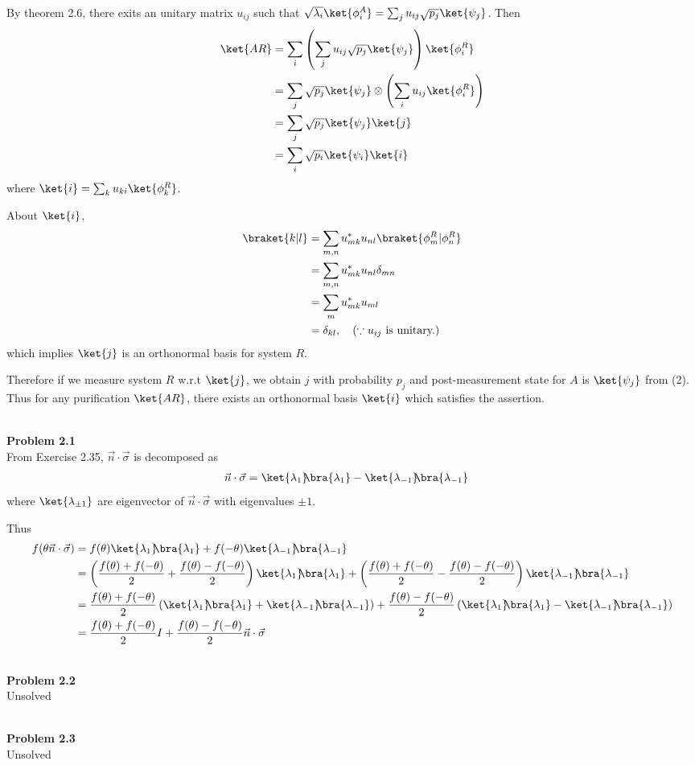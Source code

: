 \documentclass[10pt]{book}
\newcommand{\kb}[1]{\ket{#1}\hspace{-1mm} \bra{#1}} %
\newcommand{\Textbf}[1]{\hspace{3mm}\\ \textbf{#1}\\}
\begin{document}
	By theorem 2.6, there exits an unitary matrix $u_{ij}$ such that $\sqrt{\lambda_i}\ket{\phi_i^A} = \sum_j u_{ij} \sqrt{p_j} \ket{\psi_j}$.
	Then
	\begin{equation}
\begin{aligned}
		\ket{AR} &= \sum_i \left( \sum_j u_{ij} \sqrt{p_j} \ket{\psi_j} \right) \ket{\phi_i^R}\\
		&= \sum_j \sqrt{p_j} \ket{\psi_j} \otimes\left( \sum_i u_{ij} \ket{\phi_i^R} \right)\\
		&= \sum_j \sqrt{p_j} \ket{\psi_j} \ket{j}\\
		&= \sum_i \sqrt{p_i} \ket{\psi_i} \ket{i}
	\end{aligned}
\end{equation}
	where $\ket{i} = \sum_k u_{ki} \ket{\phi_k^R}$.
	
	About $\ket{i}$,
	\begin{equation}
\begin{aligned}
		\braket{k | l} &= \sum_{m,n} u_{mk}^* u_{nl} \braket{\phi_m^R | \phi_n^R }\\
		&= \sum_{m,n} u_{mk}^* u_{nl} \delta_{mn}\\
		&= \sum_m u_{mk}^* u_{ml}\\
		&= \delta_{kl}, ~~~(\because u_{ij} \text{ is unitary.})
	\end{aligned}
\end{equation}
	which implies $\ket{j}$ is an orthonormal basis for system $R$.
	
	Therefore if we measure system $R$ w.r.t $\ket{j}$, we obtain $j$ with probability $p_j$ and post-measurement state for $A$ is $\ket{\psi_j}$ from (2).
	Thus for any purification $\ket{AR}$, there exists an orthonormal basis $\ket{i}$ which satisfies the assertion.
	
	
	\Textbf{Problem 2.1}
	
	From Exercise 2.35, $\vec{n} \cdot \vec{\sigma}$ is decomposed as
	\begin{equation}
\begin{aligned}
		\vec{n} \cdot \vec{\sigma} &= \kb{\lambda_1} - \kb{\lambda_{-1}}
	\end{aligned}
\end{equation}
	where $\ket{\lambda_{\pm 1}}$ are eigenvector of $\vec{n} \cdot \vec{\sigma}$ with eigenvalues $\pm 1$.
	
	Thus
	\begin{equation}
\begin{aligned}
		f(\theta \vec{n} \cdot \vec{\sigma}) &= f(\theta) \kb{\lambda_1} + f(- \theta) \kb{\lambda_{-1}}\\
		&= \left( \frac{f(\theta) + f(-\theta)}{2} + \frac{f(\theta) - f(-\theta)}{2}  \right) \kb{\lambda_1} + \left( \frac{f(\theta) + f(-\theta)}{2} - \frac{f(\theta) - f(-\theta)}{2}  \right)\kb{\lambda_{-1}}\\
		&= \frac{f(\theta) + f(-\theta)}{2} \left( \kb{\lambda_1} + \kb{\lambda_{-1}} \right) +  \frac{f(\theta) - f(-\theta)}{2} \left(\kb{\lambda_1} - \kb{\lambda_{-1}} \right)\\
		&= \frac{f(\theta) + f(-\theta)}{2} I + \frac{f(\theta) - f(-\theta)}{2} \vec{n} \cdot \vec{\sigma}
	\end{aligned}
\end{equation}
	
	\Textbf{Problem 2.2}
	Unsolved
	
	\Textbf{Problem 2.3}
	Unsolved
	
\end{document}
